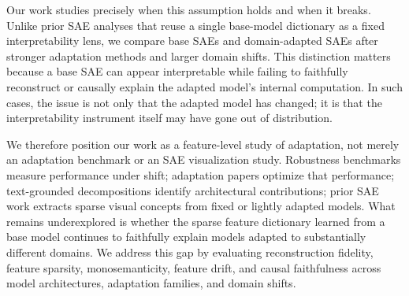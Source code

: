 Our work studies precisely when this assumption holds and when it breaks. Unlike prior SAE analyses that reuse a single base-model dictionary as a fixed interpretability lens, we compare base SAEs and domain-adapted SAEs after stronger adaptation methods and larger domain shifts. This distinction matters because a base SAE can appear interpretable while failing to faithfully reconstruct or causally explain the adapted model's internal computation. In such cases, the issue is not only that the adapted model has changed; it is that the interpretability instrument itself may have gone out of distribution.

We therefore position our work as a feature-level study of adaptation, not merely an adaptation benchmark or an SAE visualization study. Robustness benchmarks measure performance under shift; adaptation papers optimize that performance; text-grounded decompositions identify architectural contributions; prior SAE work extracts sparse visual concepts from fixed or lightly adapted models. What remains underexplored is whether the sparse feature dictionary learned from a base model continues to faithfully explain models adapted to substantially different domains. We address this gap by evaluating reconstruction fidelity, feature sparsity, monosemanticity, feature drift, and causal faithfulness across model architectures, adaptation families, and domain shifts.